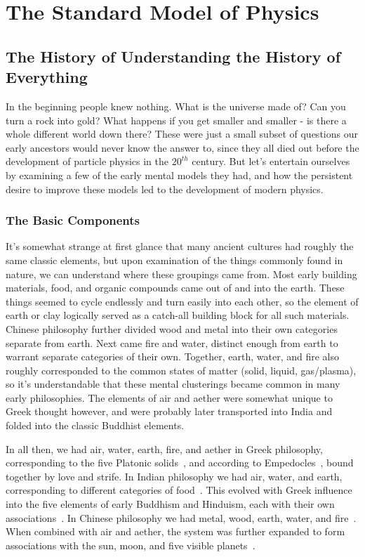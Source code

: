 \chapter{The Standard Model of Physics}\label{chap:SM}

\section{The History of Understanding the History of Everything}

In the beginning people knew nothing. What is the universe made of? Can you turn a rock into gold? What happens if you get smaller and smaller - is there a whole different world down there? These were just a small subset of questions our early ancestors would never know the answer to, since they all died out before the development of particle physics in the $20^{th}$ century. But let's entertain ourselves by examining a few of the early mental models they had, and how the persistent desire to improve these models led to the development of modern physics.

\subsection{The Basic Components}

It's somewhat strange at first glance that many ancient cultures had roughly the same classic elements, but upon examination of the things commonly found in nature, we can understand where these groupings came from. Most early building materials, food, and organic compounds came out of and into the earth. These things seemed to cycle endlessly and turn easily into each other, so the element of earth or clay logically served as a catch-all building block for all such materials. Chinese philosophy further divided wood and metal into their own categories separate from earth. Next came fire and water, distinct enough from earth to warrant separate categories of their own. Together, earth, water, and fire also roughly corresponded to the common states of matter (solid, liquid, gas/plasma), so it's understandable that these mental clusterings became common in many early philosophies. The elements of air and aether were somewhat unique to Greek thought however, and were probably later transported into India and folded into the classic Buddhist elements.

In all then, we had air, water, earth, fire, and aether in Greek philosophy, corresponding to the five Platonic solids~\cite{Plato}, and according to Empedocles~\cite{Empedocles}, bound together by love and strife. In Indian philosophy we had air, water, and earth, corresponding to different categories of food~\cite{Chandogya}. This evolved with Greek influence into the five elements of early Buddhism and Hinduism, each with their own associations~\cite{friesian}. In Chinese philosophy we had metal, wood, earth, water, and fire~\cite{Tao}. When combined with air and aether, the system was further expanded to form associations with the sun, moon, and five visible planets~\cite{friesian}.

